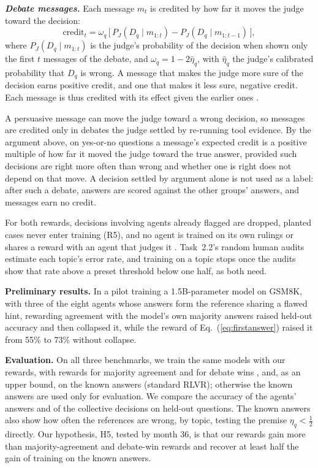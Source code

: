 \documentclass[12pt,letterpaper]{article}
\newcommand{\hd}[1]{\ifhmode\par\fi\addvspace{1pt}\noindent\textbf{#1}\hspace{0.35em}}
\newcommand{\slab}[1]{\textbf{\textit{#1}}}
\begin{document}
\slab{Debate messages.} Each message $m_t$ is credited by how far it moves the judge toward the decision:
\begin{equation}
\mathrm{credit}_t=\omega_q\,\big[\,P_J(D_q\mid m_{1:t})-P_J(D_q\mid m_{1:t-1})\,\big],
\label{eq:credit}
\end{equation}
where $P_J(D_q\mid m_{1:t})$ is the judge's probability of the decision when shown only the first $t$ messages of the debate, and $\omega_q=1-2\hat\eta_q$, with $\hat\eta_q$ the judge's calibrated probability that $D_q$ is wrong. A message that makes the judge more sure of the decision earns positive credit, and one that makes it less sure, negative credit. Each message is thus credited with its effect given the earlier ones \citep{wolpert2001optimal,agogino2008analyzing}.

A persuasive message can move the judge toward a wrong decision, so messages are credited only in debates the judge settled by re-running tool evidence. By the argument above, on yes-or-no questions a message's expected credit is a positive multiple of how far it moved the judge toward the true answer, provided such decisions are right more often than wrong and whether one is right does not depend on that move. A decision settled by argument alone is not used as a label: after such a debate, answers are scored against the other groups' answers, and messages earn no credit.

For both rewards, decisions involving agents already flagged are dropped, planted cases never enter training (R5), and no agent is trained on its own rulings or shares a reward with an agent that judges it \citep{shi2026collusion}. Task~2.2's random human audits estimate each topic's error rate, and training on a topic stops once the audits show that rate above a preset threshold below one half, as both need.

\hd{Preliminary results.} In a pilot training a 1.5B-parameter model on GSM8K, with three of the eight agents whose answers form the reference sharing a flawed hint, rewarding agreement with the model's own majority answers raised held-out accuracy and then collapsed it, while the reward of Eq.~(\ref{eq:firstanswer}) raised it from 55\% to 73\% without collapse.

\hd{Evaluation.} On all three benchmarks, we train the same models with our rewards, with rewards for majority agreement and for debate wins \citep{arnesen2024selfplay}, and, as an upper bound, on the known answers (standard RLVR); otherwise the known answers are used only for evaluation. We compare the accuracy of the agents' answers and of the collective decisions on held-out questions. The known answers also show how often the references are wrong, by topic, testing the premise $\eta_q<\frac12$ directly. Our hypothesis, H5, tested by month 36, is that our rewards gain more than majority-agreement and debate-win rewards and recover at least half the gain of training on the known answers.
\end{document}
